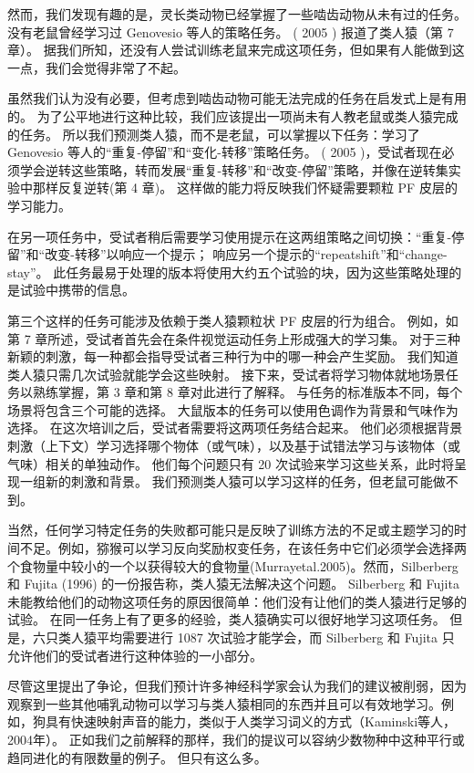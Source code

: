 \par 
然而，我们发现有趣的是，灵长类动物已经掌握了一些啮齿动物从未有过的任务。 没有老鼠曾经学习过 Genovesio 等人的策略任务。 ( 2005 ) 报道了类人猿（第 7 章）。 据我们所知，还没有人尝试训练老鼠来完成这项任务，但如果有人能做到这一点，我们会觉得非常了不起。
\par 
虽然我们认为没有必要，但考虑到啮齿动物可能无法完成的任务在启发式上是有用的。 为了公平地进行这种比较，我们应该提出一项尚未有人教老鼠或类人猿完成的任务。 所以我们预测类人猿，而不是老鼠，可以掌握以下任务：学习了 Genovesio 等人的“重复-停留”和“变化-转移”策略任务。 ( 2005 )，受试者现在必须学会逆转这些策略，转而发展“重复-转移”和“改变-停留”策略，并像在逆转集实验中那样反复逆转(第 4 章)。 这样做的能力将反映我们怀疑需要颗粒 PF 皮层的学习能力。
\par 
在另一项任务中，受试者稍后需要学习使用提示在这两组策略之间切换：“重复-停留”和“改变-转移”以响应一个提示； 响应另一个提示的“repeatshift”和“change-stay”。 此任务最易于处理的版本将使用大约五个试验的块，因为这些策略处理的是试验中携带的信息。
\par 
第三个这样的任务可能涉及依赖于类人猿颗粒状 PF 皮层的行为组合。 例如，如第 7 章所述，受试者首先会在条件视觉运动任务上形成强大的学习集。 对于三种新颖的刺激，每一种都会指导受试者三种行为中的哪一种会产生奖励。 我们知道类人猿只需几次试验就能学会这些映射。 接下来，受试者将学习物体就地场景任务以熟练掌握，第 3 章和第 8 章对此进行了解释。 与任务的标准版本不同，每个场景将包含三个可能的选择。 大鼠版本的任务可以使用色调作为背景和气味作为选择。 在这次培训之后，受试者需要将这两项任务结合起来。 他们必须根据背景刺激（上下文）学习选择哪个物体（或气味），以及基于试错法学习与该物体（或气味）相关的单独动作。 他们每个问题只有 20 次试验来学习这些关系，此时将呈现一组新的刺激和背景。 我们预测类人猿可以学习这样的任务，但老鼠可能做不到。
\par 
当然，任何学习特定任务的失败都可能只是反映了训练方法的不足或主题学习的时间不足。例如，猕猴可以学习反向奖励权变任务，在该任务中它们必须学会选择两个食物量中较小的一个以获得较大的食物量(Murrayetal.2005)。然而，Silberberg 和 Fujita (1996) 的一份报告称，类人猿无法解决这个问题。 Silberberg 和 Fujita 未能教给他们的动物这项任务的原因很简单：他们没有让他们的类人猿进行足够的试验。 在同一任务上有了更多的经验，类人猿确实可以很好地学习这项任务。 但是，六只类人猿平均需要进行 1087 次试验才能学会，而 Silberberg 和 Fujita 只允许他们的受试者进行这种体验的一小部分。
\par 
尽管这里提出了争论，但我们预计许多神经科学家会认为我们的建议被削弱，因为观察到一些其他哺乳动物可以学习与类人猿相同的东西并且可以有效地学习。例如，狗具有快速映射声音的能力，类似于人类学习词义的方式（Kaminski等人，2004年）。 正如我们之前解释的那样，我们的提议可以容纳少数物种中这种平行或趋同进化的有限数量的例子。 但只有这么多。
